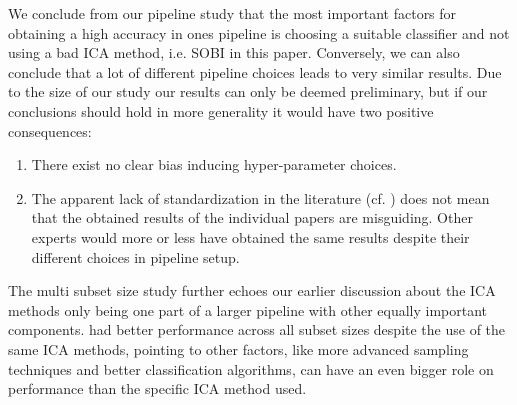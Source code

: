 	We conclude from our pipeline study that the most important factors for obtaining a high accuracy in ones pipeline is choosing a suitable classifier and not using a bad ICA method, i.e. SOBI in this paper. Conversely, we can also conclude that a lot of different pipeline choices leads to very similar results. Due to the size of our study our results can only be deemed preliminary, but if our conclusions should hold in more generality it would have two positive consequences: 
		\begin{enumerate}[noitemsep]
			\item There exist no clear bias inducing hyper-parameter choices. 
			\item The apparent lack of standardization in the literature (cf. \cite{newson2019}) does not mean that the obtained results of the individual papers are misguiding. Other experts would more or less have obtained the same results despite their different choices in pipeline setup. 
		\end{enumerate}
	The multi subset size study further echoes our earlier discussion about the ICA methods only being one part of a larger pipeline with other equally important components. \cite{pfister2019} had better performance across all subset sizes despite the use of the same ICA methods, pointing to other factors, like more advanced sampling techniques and better classification algorithms, can have an even bigger role on performance than the specific ICA method used. 























